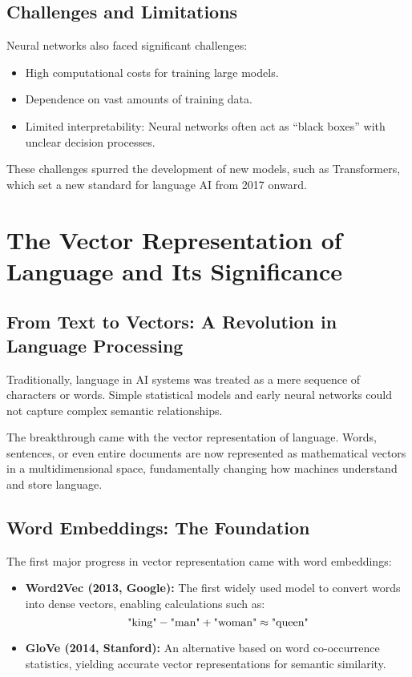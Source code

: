 \subsection{Challenges and Limitations}

Neural networks also faced significant challenges:
\begin{itemize}
  \item High computational costs for training large models.
  \item Dependence on vast amounts of training data.
  \item Limited interpretability: Neural networks often act as “black boxes” with
        unclear decision processes.
\end{itemize}

These challenges spurred the development of new models, such as Transformers, which
set a new standard for language AI from 2017 onward.


\section{The Vector Representation of Language and Its Significance}

\subsection{From Text to Vectors: A Revolution in Language Processing}

Traditionally, language in AI systems was treated as a mere sequence of characters or words.
Simple statistical models and early neural networks could not capture complex semantic
relationships.

The breakthrough came with the vector representation of language. Words, sentences, or even
entire documents are now represented as mathematical vectors in a multidimensional space,
fundamentally changing how machines understand and store language.

\subsection{Word Embeddings: The Foundation}

The first major progress in vector representation came with word embeddings:
\begin{itemize}
  \item \textbf{Word2Vec (2013, Google):} The first widely used model to convert words into
        dense vectors, enabling calculations such as:
        \[
        \mbox{"king"} - \mbox{"man"} + \mbox{"woman"} \approx \mbox{"queen"}
        \]
  \item \textbf{GloVe (2014, Stanford):} An alternative based on word co-occurrence statistics,
        yielding accurate vector representations for semantic similarity.
\end{itemize}

